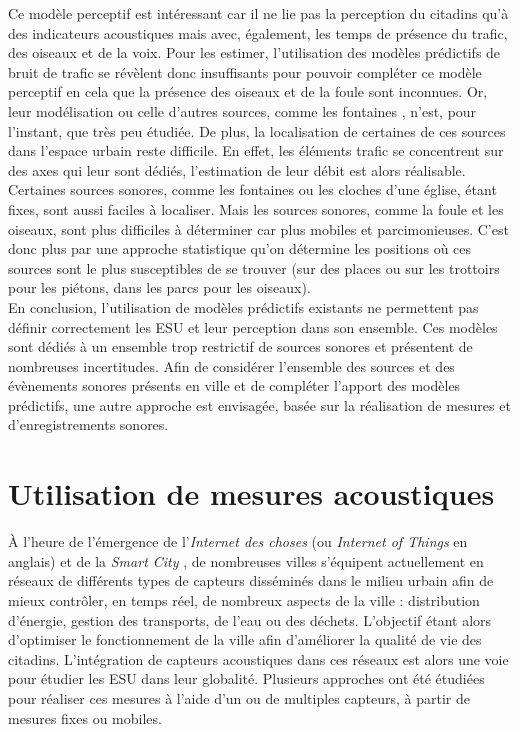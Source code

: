 Ce modèle perceptif est intéressant car il ne lie pas la perception du citadins qu'à des indicateurs acoustiques mais avec, également, les temps de présence du trafic, des oiseaux et de la voix. Pour les estimer, l'utilisation des modèles prédictifs de bruit de trafic se révèlent donc insuffisants pour pouvoir compléter ce modèle perceptif en cela que la présence des oiseaux et de la foule sont inconnues. Or, leur modélisation \cite{hayne2011prediction} \cite{} ou celle d'autres sources, comme les fontaines \cite{watts2009measurement}, n'est, pour l'instant, que très peu étudiée.
De plus, la localisation de certaines de ces sources dans l'espace urbain reste difficile. En effet, les éléments trafic se concentrent sur des axes qui leur sont dédiés, l'estimation de leur débit est alors réalisable. Certaines sources sonores, comme les fontaines ou les cloches d'une église, étant fixes, sont aussi faciles à localiser. Mais les sources sonores, comme la foule et les oiseaux, sont plus difficiles à déterminer car plus mobiles et parcimonieuses. C'est donc plus par une approche statistique qu'on détermine les positions où ces sources sont le plus susceptibles de se trouver (sur des places ou sur les trottoirs pour les piétons, dans les parcs pour les oiseaux).\\

En conclusion, l'utilisation de modèles prédictifs existants ne permettent pas définir correctement les ESU et leur perception dans son ensemble. Ces modèles sont dédiés à un ensemble trop restrictif de sources sonores et présentent de nombreuses incertitudes. Afin de considérer l'ensemble des sources et des évènements sonores présents en ville et de compléter l'apport des modèles prédictifs, une autre approche est envisagée, basée sur la réalisation de mesures et d'enregistrements sonores. 

\section{Utilisation de mesures acoustiques}

À l'heure de l'émergence de l'\textit{Internet des choses} (ou \textit{Internet of Things} en anglais) \cite{zanella2014internet} et de la \textit{Smart City} \cite{chourabi2012understanding}, de nombreuses villes s'équipent actuellement en réseaux de différents types de capteurs disséminés dans le milieu urbain afin de mieux contrôler, en temps réel, de nombreux aspects de la ville : distribution d'énergie, gestion des transports, de l’eau ou des déchets. L'objectif étant alors d'optimiser le fonctionnement de la ville afin d'améliorer la qualité de vie des citadins.
L'intégration de capteurs acoustiques dans ces réseaux est alors une voie pour étudier les ESU dans leur globalité. Plusieurs approches ont été étudiées pour réaliser ces mesures à l'aide d'un ou de multiples capteurs, à partir de mesures fixes ou mobiles.

